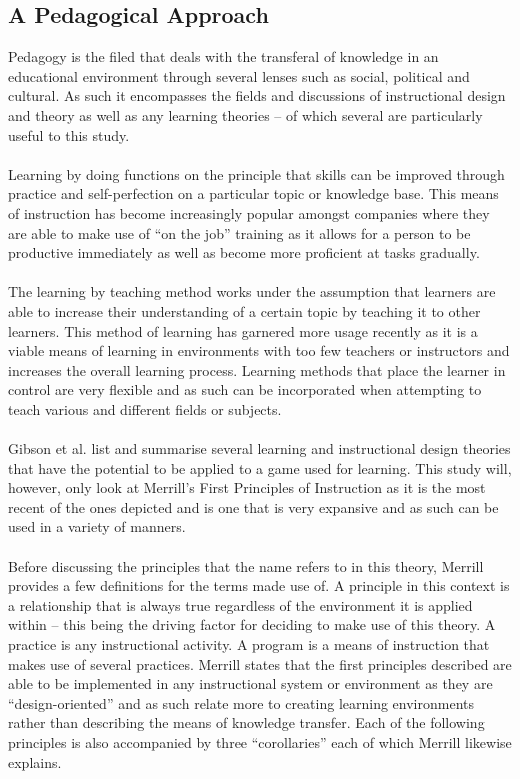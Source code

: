 \documentclass[conference]{IEEEtran}
\begin{document}
\subsection{A Pedagogical Approach}
Pedagogy is the filed that deals with the transferal of knowledge in an educational environment through several lenses such as social, political and cultural\cite{Li2012}. As such it encompasses the fields and discussions of instructional design and theory as well as any learning theories – of which several are particularly useful to this study.
\\\\
Learning by doing functions on the principle that skills can be improved through practice and self-perfection on a particular topic or knowledge base\cite{Fisch2009}. This means of instruction has become increasingly popular amongst companies where they are able to make use of “on the job” training as it allows for a person to be productive immediately as well as become more proficient at tasks gradually\cite{Fisch2009}. 
\\\\
The learning by teaching method works under the assumption that learners are able to increase their understanding of a certain topic by teaching it to other learners\cite{Fisch2009}. This method of learning has garnered more usage recently as it is a viable means of learning in environments with too few teachers or instructors and increases the overall learning process\cite{Fisch2009}. Learning methods that place the learner in control are very flexible and as such can be incorporated when attempting to teach various and different fields or subjects\cite{Ackoff1991}. 
\\\\
Gibson et al.\cite{gibson2006games} list and summarise several learning and instructional design theories that have the potential to be applied to a game used for learning. This study will, however, only look at Merrill’s First Principles of Instruction as it is the most recent of the ones depicted  and is one that is very expansive and as such can be used in a variety of manners\cite{gibson2006games}.
\\\\
Before discussing the principles that the name refers to in this theory, Merrill\cite{Merrill2002} provides a few definitions for the terms made use of. A principle in this context is a relationship that is always true regardless of the environment it is applied within – this being the driving factor for deciding to make use of this theory\cite{Merrill2002}. A practice is any instructional activity\cite{Merrill2002}. A program is a means of instruction that makes use of several practices\cite{Merrill2002}. Merrill\cite{Merrill2002} states that the first principles described are able to be implemented in any instructional system or environment as they are “design-oriented” and as such relate more to creating learning environments rather than describing the means of knowledge transfer. Each of the following principles is also accompanied by three “corollaries” each of which Merrill\cite{Merrill2002} likewise explains.
\end{document}
